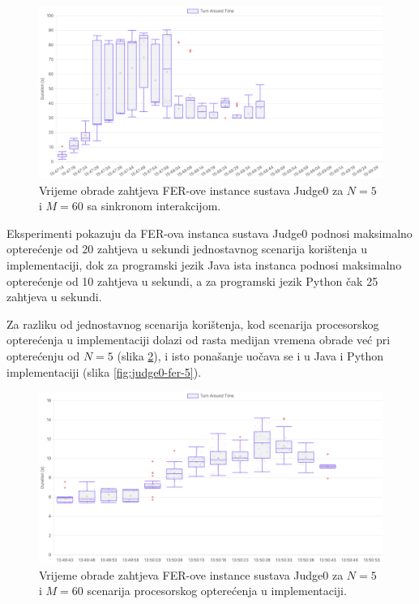 \documentclass[times, utf8, diplomski]{fer}
\begin{document}
\begin{figure}[htb]
	\centering
	\includegraphics[width=\textwidth]{images/Judge0 FER TAT for sync 5 5s.png}
	\caption{
		Vrijeme obrade zahtjeva FER-ove instance sustava Judge0 za $N=5$ i $M=60$ sa sinkronom interakcijom.
	}
	\label{fig:judge0-fer-3}
\end{figure}

Eksperimenti pokazuju da FER-ova instanca sustava Judge0 podnosi maksimalno opterećenje od 20 zahtjeva u sekundi jednostavnog scenarija korištenja u  implementaciji, dok za programski jezik Java ista instanca podnosi maksimalno opterećenje od 10 zahtjeva u sekundi, a za programski jezik Python čak 25 zahtjeva u sekundi.

Za razliku od jednostavnog scenarija korištenja, kod scenarija procesorskog opterećenja u  implementaciji dolazi od rasta medijan vremena obrade već pri opterećenju od $N=5$ (slika \ref{fig:judge0-fer-4}), i isto ponašanje uočava se i u Java i Python implementaciji (slika \ref{fig:judge0-fer-5}).

\begin{figure}[htb]
	\centering
	\includegraphics[width=\textwidth]{images/Judge0 FER TAT for CPU Intensive 5x60 5s.png}
	\caption{
		Vrijeme obrade zahtjeva FER-ove instance sustava Judge0 za $N=5$ i $M=60$ scenarija procesorskog opterećenja u  implementaciji.
	}
	\label{fig:judge0-fer-4}
\end{figure}
\end{document}
